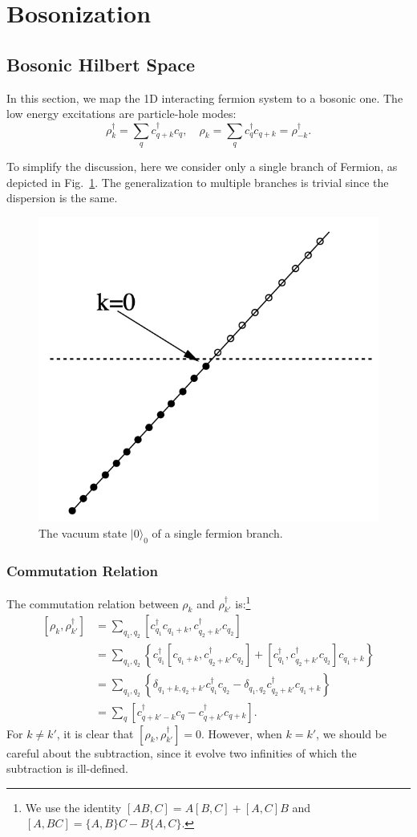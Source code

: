 \section{Bosonization}

\subsection{Bosonic Hilbert Space}

In this section, we map the 1D interacting fermion system to a bosonic one.
The low energy excitations are particle-hole modes:
\begin{equation}
	\rho_{k}^\dagger = \sum_{q} c_{q+k}^\dagger c_{q}, \quad
	\rho_{k} = \sum_{q} c_{q}^\dagger c_{q+k} = \rho_{-k}^\dagger.
\end{equation}

To simplify the discussion, here we consider only a single branch of Fermion, as depicted in Fig.~\ref{fig:bs-hilbert}. The generalization to multiple branches is trivial since the dispersion is the same.

\begin{figure}
	\centering
	\includegraphics[width=0.25\linewidth]{pics/LL-hilbert.png}
	\caption{The vacuum state $|0\rangle_0$ of a single fermion branch.}
	\label{fig:bs-hilbert}
\end{figure}

\subsubsection*{Commutation Relation}
The commutation relation between $\rho_k$ and $\rho_{k'}^\dagger$ is:\footnote{We use the identity $[AB,C] = A[B,C] + [A,C]B$ and $[A,BC]=\{A,B\}C - B\{A,C\}$.}
\begin{equation}
\begin{aligned}
	\left[\rho_{k}, \rho_{k'}^\dagger \right]
	&= \sum_{q_1, q_2} \left[c_{q_1}^\dagger c_{q_1+k}, c_{q_2+k'}^\dagger c_{q_2}\right] \\
	&= \sum_{q_1, q_2} \left\{c_{q_1}^\dagger \left[c_{q_1+k}, c_{q_2+k'}^\dagger c_{q_2}\right] +\left[c_{q_1}^\dagger, c_{q_2+k'}^\dagger c_{q_2}\right] c_{q_1+k}\right\} \\
	&= \sum_{q_1, q_2} \left\{ \delta_{q_1+k,q_2+k'} c_{q_1}^\dagger c_{q_2} -
		\delta_{q_1,q_2} c_{q_2+k'}^\dagger c_{q_1+k} \right\} \\
	&= \sum_{q}\left[c^\dagger_{q+k'-k} c_{q}-c^\dagger_{q+k'} c_{q+k}\right].
\end{aligned}
\end{equation}
For $k \ne k'$, it is clear that $[\rho_{k},\rho_{k'}^\dagger]=0$.
However, when $k = k'$, we should be careful about the subtraction, since it evolve two infinities of which the subtraction is ill-defined.

